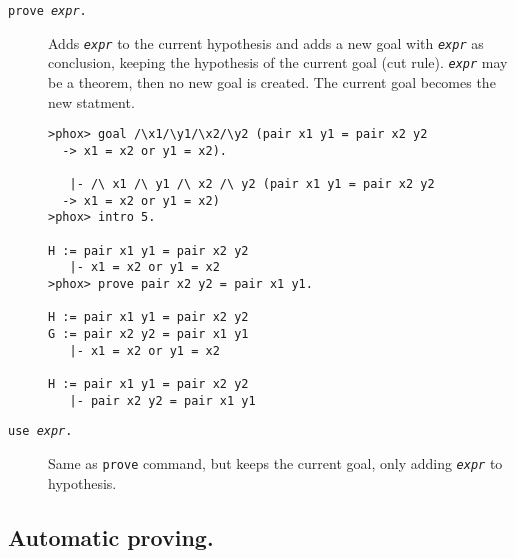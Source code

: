 \begin{description}
\item[{\tt prove {\em expr}.}]
  
  Adds {\tt\em expr} to the current hypothesis and adds a new goal with
  {\tt\em expr} as conclusion, keeping the hypothesis of the current
  goal (cut rule). {\tt\em expr} may be a theorem, then no new goal is
  created. The current goal becomes the new statment.

\begin{verbatim}
>phox> goal /\x1/\y1/\x2/\y2 (pair x1 y1 = pair x2 y2 
  -> x1 = x2 or y1 = x2).

   |- /\ x1 /\ y1 /\ x2 /\ y2 (pair x1 y1 = pair x2 y2 
  -> x1 = x2 or y1 = x2)
>phox> intro 5.

H := pair x1 y1 = pair x2 y2
   |- x1 = x2 or y1 = x2
>phox> prove pair x2 y2 = pair x1 y1.
 
H := pair x1 y1 = pair x2 y2
G := pair x2 y2 = pair x1 y1
   |- x1 = x2 or y1 = x2

H := pair x1 y1 = pair x2 y2
   |- pair x2 y2 = pair x1 y1
\end{verbatim}
  
\item[{\tt use {\em expr}.}]
  Same as {\tt prove} command, but keeps the current goal, only adding
  {\tt\em expr} to hypothesis.
\end{description}

\subsection{Automatic proving.}

